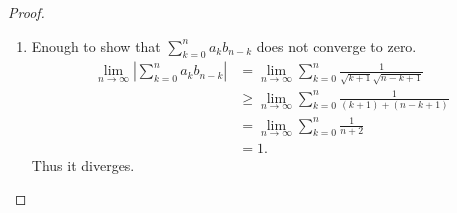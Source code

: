 \documentclass{article}
\begin{document}
\begin{enumerate}[font = \Large\bfseries\itshape\space, leftmargin = 3mm, labelsep = 3mm]
\begin{proof}
\begin{enumerate}[wide, label=(\roman*)]
\item
Enough to show that $\sum_{k=0}^n a_kb_{n-k}$ does not converge to zero.
$$
\begin{aligned}
\lim_{n\rightarrow \infty} |\sum_{k=0}^n a_kb_{n-k}|
&= \lim_{n\rightarrow \infty} \sum_{k=0}^n \frac{1}{\sqrt{k+1}\sqrt{n-k+1}}\\
&\geq \lim_{n\rightarrow\infty} \sum_{k=0}^n \frac{1}{(k+1) + (n-k+1)}\\
&= \lim_{n\rightarrow \infty} \sum_{k=0}^n \frac{1}{n+2}\\
&=1.
\end{aligned}
$$
Thus it diverges.

\end{enumerate}
\end{proof}

\end{enumerate}
\end{document}
